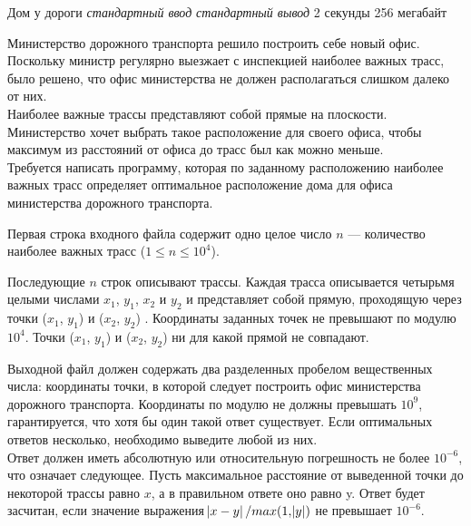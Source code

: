 \begin{problem}%
{Дом у дороги}%
{\textsl{стандартный ввод}}%
{\textsl{стандартный вывод}}%
{2 секунды}%
{256 мегабайт}{}

Министерство дорожного транспорта решило построить себе новый офис. Поскольку министр регулярно выезжает с инспекцией наиболее важных трасс, было решено, что офис министерства не должен располагаться слишком далеко от них.\\

Наиболее важные трассы представляют собой прямые на плоскости. Министерство хочет выбрать такое расположение для своего офиса, чтобы максимум из расстояний от офиса до трасс был как можно меньше.\\

Требуется написать программу, которая по заданному расположению наиболее важных трасс определяет оптимальное расположение дома для офиса министерства дорожного транспорта.\\

\InputFile

Первая строка входного файла содержит одно целое число $n$ — количество наиболее важных трасс ($1 \le n \le 10^4$).

Последующие $n$ строк описывают трассы. Каждая трасса описывается четырьмя целыми числами $x_1$, $y_1$, $x_2$ и $y_2$ и представляет собой прямую, проходящую через точки ($x_1$, $y_1$) и ($x_2$, $y_2$) . Координаты заданных точек не превышают по модулю $10^4$. Точки ($x_1$, $y_1$) и ($x_2$, $y_2$)  ни для какой прямой не совпадают.

\OutputFile

Выходной файл должен содержать два разделенных пробелом вещественных числа: координаты точки, в которой следует построить офис министерства дорожного транспорта. Координаты по модулю не должны превышать $10^9$, гарантируется, что хотя бы один такой ответ существует. Если оптимальных ответов несколько, необходимо выведите любой из них.\\

Ответ должен иметь абсолютную или относительную погрешность не более $10^{-6}$, что означает следующее. Пусть максимальное расстояние от выведенной точки до некоторой трассы равно $x$, а в правильном ответе оно равно y. Ответ будет засчитан, если значение выражения $\abs{x - y} / max(1, \abs{y})$  не превышает $10^{-6}$.

\Examples

\begin{example}
%
%
\end{example}
\end{problem}